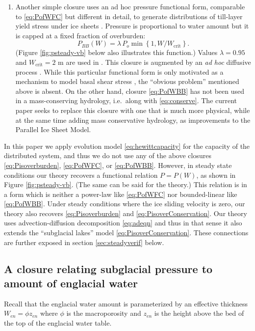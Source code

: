 \documentclass[11pt,final]{amsart}%
\begin{document}
\begin{enumerate}
\item Another simple closure uses an ad hoc pressure functional form, comparable to \eqref{eq:PofWFC} but different in detail, to generate distributions of till-layer yield stress under ice sheets \citep{BBssasliding}.  Pressure is proportional to water amount but it is capped at a fixed fraction of overburden:
\begin{equation}
P_{BB}(W) = \lambda\,P_o \min\left\{1,W/W_{\text{crit}}\right\}. \label{eq:PofWBB}
\end{equation}
(Figure \ref{fig:psteady-vb} below also illustrates this function.)  Values $\lambda=0.95$ and $W_{\text{crit}}=2$ m are used in \citep{BBssasliding}.  This closure is augmented by an \emph{ad hoc} diffusive process \citep[equation (11) in][]{BBssasliding}.  While this particular functional form is only motivated as a mechanism to model basal shear stress \citep{Tulaczyketal2000b}, the ``obvious problem'' mentioned above is absent.  On the other hand, closure \eqref{eq:PofWBB} has not been used in a mass-conserving hydrology, i.e.~along with \eqref{eq:conserve}.  The current paper seeks to replace this closure with one that is much more physical, while at the same time adding mass conservative hydrology, as improvements to the Parallel Ice Sheet Model.
\end{enumerate}

In this paper we apply evolution model \eqref{eq:hewittcapacity} for the capacity of the distributed system, and thus we do not use any of the above closures \eqref{eq:Pisoverburden}, \eqref{eq:PofWFC}, or \eqref{eq:PofWBB}.  However, in steady state conditions our theory recovers a functional relation $P=P(W)$, as shown in Figure \ref{fig:psteady-vb}.  (The same can be said for the \cite{Schoofetal2012} theory.)  This relation is in a form which is neither a power-law like \eqref{eq:PofWFC} nor bounded-linear like \eqref{eq:PofWBB}.  Under steady conditions where the ice sliding velocity is zero, our theory also recovers \eqref{eq:Pisoverburden} and \eqref{eq:PisoverConservation}.  Our theory uses advection-diffusion decomposition \eqref{eq:adeqn} and thus in that sense it also extends the ``subglacial lakes'' model \eqref{eq:PisoverConservation}.  These connections are further exposed in section \ref{sec:steadyverif} below.

\subsection*{A closure relating subglacial pressure to amount of englacial water}  Recall that the englacial water amount is parameterized by an effective thickness $W_{en}=\phi z_{en}$ where $\phi$ is the macroporosity and $z_{en}$ is the height above the bed of the top of the englacial water table.
\end{document}
